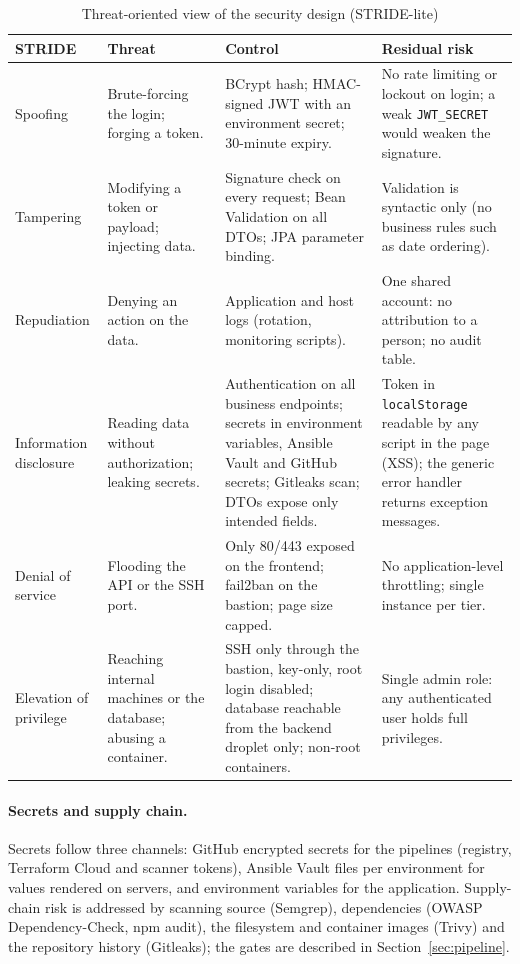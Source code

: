 \begin{table}[htbp]
\centering
\caption{Threat-oriented view of the security design (STRIDE-lite)}
\label{tab:stride}
\renewcommand{\arraystretch}{1.1}
\footnotesize
\begin{tabularx}{\linewidth}{@{}l>{\raggedright\arraybackslash}p{2.7cm}>{\raggedright\arraybackslash}X>{\raggedright\arraybackslash}X@{}}
\toprule
\textbf{STRIDE} & \textbf{Threat} & \textbf{Control} & \textbf{Residual risk} \\
\midrule
Spoofing & Brute-forcing the login; forging a token. & BCrypt hash; HMAC-signed JWT with an environment secret; 30-minute expiry. & No rate limiting or lockout on login; a weak \texttt{JWT\_SECRET} would weaken the signature. \\
Tampering & Modifying a token or payload; injecting data. & Signature check on every request; Bean Validation on all DTOs; JPA parameter binding. & Validation is syntactic only (no business rules such as date ordering). \\
Repudiation & Denying an action on the data. & Application and host logs (rotation, monitoring scripts). & One shared account: no attribution to a person; no audit table. \\
Information disclosure & Reading data without authorization; leaking secrets. & Authentication on all business endpoints; secrets in environment variables, Ansible Vault and GitHub secrets; Gitleaks scan; DTOs expose only intended fields. & Token in \texttt{localStorage} readable by any script in the page (XSS); the generic error handler returns exception messages. \\
Denial of service & Flooding the API or the SSH port. & Only 80/443 exposed on the frontend; fail2ban on the bastion; page size capped. & No application-level throttling; single instance per tier. \\
Elevation of privilege & Reaching internal machines or the database; abusing a container. & SSH only through the bastion, key-only, root login disabled; database reachable from the backend droplet only; non-root containers. & Single admin role: any authenticated user holds full privileges. \\
\bottomrule
\end{tabularx}
\end{table}

\paragraph{Secrets and supply chain.} Secrets follow three channels: GitHub encrypted secrets for the pipelines (registry, Terraform Cloud and scanner tokens), Ansible Vault files per environment for values rendered on servers, and environment variables for the application. Supply-chain risk is addressed by scanning source (Semgrep), dependencies (OWASP Dependency-Check, npm audit), the filesystem and container images (Trivy) and the repository history (Gitleaks); the gates are described in Section~\ref{sec:pipeline}.


